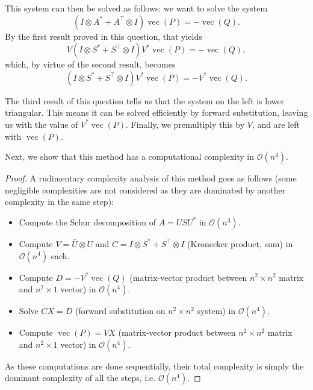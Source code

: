 \documentclass[11pt]{article}
\newcommand{\kp}{\otimes}
\DeclareMathOperator{\vect}{vec}
\newcommand{\bo}{\mathcal{O}}
\begin{document}
This system can then be solved as follows: we want to solve the system
\[
(I \kp A^* + A^\top \kp I) \vect(P) = -\vect(Q).
\]
By the first result proved in this question, that yields
\[
V (I \kp S^* + S^\top \kp I) V^* \vect(P) = -\vect(Q),
\]
which, by virtue of the second result, becomes
\[
(I \kp S^* + S^\top \kp I) V^* \vect(P) = - V^*\vect(Q).
\]

The third result of this question tells us that the system on the left is lower triangular.
This means it can be solved efficiently by forward substitution, leaving us with the value of \(V^* \vect(P)\).
Finally, we premultiply this by \(V\), and are left with \(\vect(P)\).

Next, we show that this method has a computational complexity in \(\bo(n^4)\).
\begin{proof}
A rudimentary complexity analysis of this method goes as follows (some negligible complexities are not considered as they are dominated by another complexity in the same step):
\begin{itemize}
	\item Compute the Schur decomposition of \(A = U S U^*\) in \(\bo(n^3)\).
	\item Compute \(V = \bar{U} \kp U\) and \(C = I \kp S^* + S^\top \kp I\) (Kronecker product, sum) in \(\bo(n^4)\) each.
	\item Compute \(D = -V^* \vect(Q)\) (matrix-vector product between \(n^2 \times n^2\) matrix and \(n^2 \times 1\) vector) in \(\bo(n^4)\).
	\item Solve \(C X = D\) (forward substitution on \(n^2 \times n^2\) system) in \(\bo(n^4)\).
	\item Compute \(\vect(P) = VX\) (matrix-vector product between \(n^2 \times n^2\) matrix and \(n^2 \times 1\) vector) in \(\bo(n^4)\).
\end{itemize}
As these computations are done sequentially, their total complexity is simply the dominant complexity of all the steps, i.e. \(\bo(n^4)\).
\end{proof}
\end{document}
